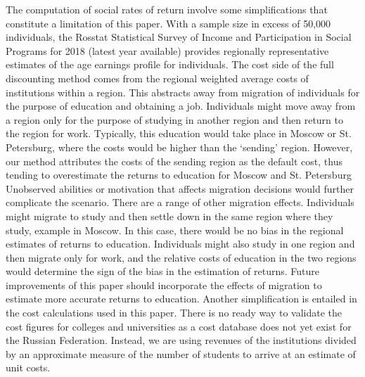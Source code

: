 \documentclass[alpha-refs]{wiley-article-05g}
\begin{document}
The computation of social rates of return involve some simplifications that 
constitute a limitation of this paper. With a sample size in excess of 
50,000 individuals, the Rosstat Statistical Survey of Income and 
Participation in Social Programs for 2018 (latest year available) provides 
regionally representative estimates of the age earnings profile for 
individuals. The cost side of the full discounting method comes from the 
regional weighted average costs of institutions within a region. This 
abstracts away from migration of individuals for the purpose of education 
and obtaining a job. Individuals might move away from a region only for the 
purpose of studying in another region and then return to the region for 
work. Typically, this education would take place in Moscow or St. 
Petersburg, where the costs would be higher than the `sending' region. 
However, our method attributes the costs of the sending region as the 
default cost, thus tending to overestimate the returns to education for 
Moscow and St. Petersburg Unobserved abilities or motivation that affects 
migration decisions would further complicate the scenario. There are a 
range of other migration effects. Individuals might migrate to study and 
then settle down in the same region where they study, example in Moscow. In 
this case, there would be no bias in the regional estimates of returns to 
education. Individuals might also study in one region and then migrate only 
for work, and the relative costs of education in the two regions would 
determine the sign of the bias in the estimation of returns.  Future 
improvements of this paper should incorporate the effects of migration to 
estimate more accurate returns to education. 
Another simplification is entailed in the cost calculations used in this paper. There is no ready way to validate the cost figures for colleges and universities as a cost database does not yet exist for the Russian Federation. Instead, we are using revenues of the institutions divided by an approximate measure of the number of students to arrive at an estimate of unit costs. 

\vspace{-0.5em}
\end{document}
